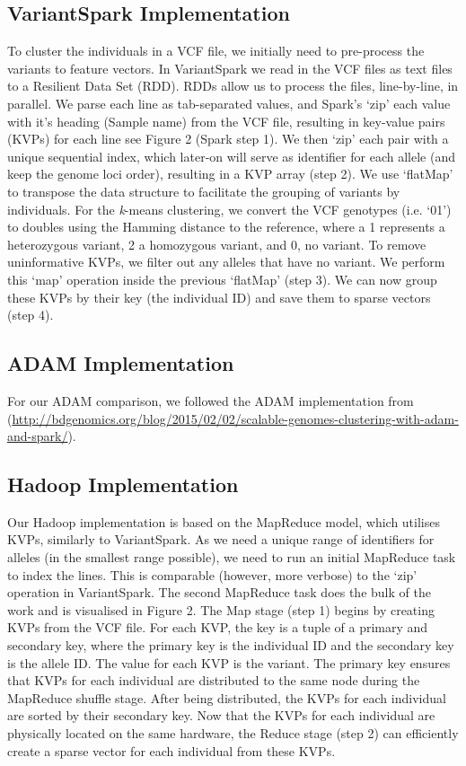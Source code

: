 \documentclass{bmcart}
\newcommand{\variantSpark}{{\sc VariantSpark}}
\newcommand{\kMeans}{\textit{k}-means}
\begin{document}
\subsection*{VariantSpark Implementation}
To cluster the individuals in a VCF file, we initially need to pre-process the variants to feature vectors.
In \variantSpark{} we read in the VCF files as text files to a Resilient Data Set (RDD). RDDs allow us to process the files, line-by-line, in parallel. We parse each line as tab-separated values, and Spark's `zip' each value with it's heading (Sample name) from the VCF file, resulting in key-value pairs (KVPs) for each line see Figure 2 (Spark step 1). 
We then `zip' each pair with a unique sequential index, which later-on will serve as identifier for each allele (and keep the genome loci order), resulting in a KVP array (step 2).
We use `flatMap' to transpose the data structure to facilitate the grouping of variants by individuals.
For the \kMeans{} clustering, we convert the VCF genotypes (i.e. `0\textbar{}1') to doubles using the Hamming distance to the reference, where a 1 represents a heterozygous variant, 2 a homozygous variant, and 0, no variant. 
To remove uninformative KVPs,  we filter out any alleles that have no variant. 
We perform this `map' operation inside the previous `flatMap' (step 3).
We can now group these KVPs by their key (the individual ID) and save them to sparse vectors (step 4).


\subsection*{{\sc ADAM} Implementation}
For our {\sc ADAM} comparison, we followed the {\sc ADAM} implementation from (\url{http://bdgenomics.org/blog/2015/02/02/scalable-genomes-clustering-with-adam-and-spark/}).

\subsection*{Hadoop Implementation}
Our Hadoop implementation is based on the MapReduce model, which utilises KVPs, similarly to \variantSpark{}.
As we need a unique range of identifiers for alleles (in the smallest range possible), we need to run an initial MapReduce task to index the lines. This is comparable (however, more verbose) to the `zip' operation in \variantSpark{}.
The second MapReduce task does the bulk of the work and is visualised in Figure 2. The Map stage (step 1) begins by creating KVPs from the VCF file. For each KVP, the key is a tuple of a primary and secondary key, where the primary key is the individual ID and the secondary key is the allele ID. The value for each KVP is the variant.
The primary key ensures that KVPs for each individual are distributed to the same node during the MapReduce shuffle stage. After being distributed, the KVPs for each individual are sorted by their secondary key.
Now that the KVPs for each individual are physically located on the same hardware, the Reduce stage (step 2) can efficiently create a sparse vector for each individual from these KVPs. 
\end{document}
